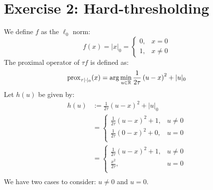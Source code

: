 \documentclass[12pt]{article}
\newcommand{\prox}{\operatorname{prox}}
\begin{document}
\section{Exercise 2: Hard-thresholding}
We define $f$ as the $\ell_0$ norm:
\begin{equation*}
  f(x) = |x|_0 = \begin{cases}
    0, & x = 0    \\
    1, & x \neq 0
  \end{cases}
\end{equation*}
The proximal operator of $\tau f$ is defined as:
\begin{equation*}
  \prox_{\tau |\cdot|_0}(x) = \arg\min_{u \in \R} \frac{1}{2\tau}\left(u-x \right)^2 + |u|_0
\end{equation*}
Let $h(u)$ be given by:
\begin{align*}
  h(u)
   & := \frac{1}{2\tau}\left(u-x \right)^2 + |u|_0 \\
   & =
  \begin{cases}
    \frac{1}{2\tau} \left(u-x \right)^2 + 1,  & u \neq 0 \\
    \frac{1}{2\tau} \left( 0-x \right)^2 + 0, & u = 0    \\
  \end{cases}                       \\
   & =
  \begin{cases}
    \frac{1}{2\tau} \left(u-x \right)^2 + 1, & u \neq 0 \\
    \frac{x^2}{2\tau},                       & u = 0    \\
  \end{cases}                       \\
\end{align*}
We have two cases to consider: $u \neq 0$ and $u = 0$.
\end{document}
